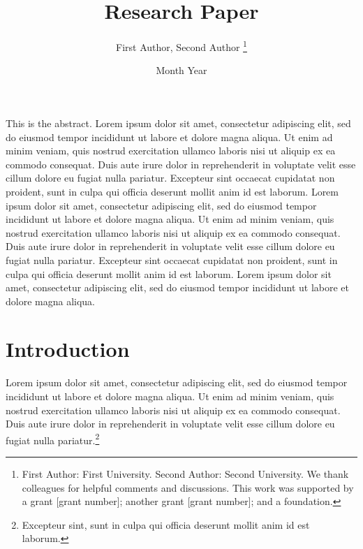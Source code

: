 \documentclass[letterpaper,11pt,leqno]{article}
\begin{document}
\title{Research Paper}

\author{First Author, Second Author
%
\thanks{First Author: First University. Second Author: Second University. We thank colleagues for helpful comments and discussions. This work was supported by a grant [grant number]; another grant [grant number]; and a foundation.}}

\date{Month Year}   


\begin{titlepage}
\maketitle

This is the abstract. Lorem ipsum dolor sit amet, consectetur adipiscing elit, sed do eiusmod tempor incididunt ut labore et dolore magna aliqua. Ut enim ad minim veniam, quis nostrud exercitation ullamco laboris nisi ut aliquip ex ea commodo consequat. Duis aute irure dolor in reprehenderit in voluptate velit esse cillum dolore eu fugiat nulla pariatur. Excepteur sint occaecat cupidatat non proident, sunt in culpa qui officia deserunt mollit anim id est laborum. Lorem ipsum dolor sit amet, consectetur adipiscing elit, sed do eiusmod tempor incididunt ut labore et dolore magna aliqua. Ut enim ad minim veniam, quis nostrud exercitation ullamco laboris nisi ut aliquip ex ea commodo consequat. Duis aute irure dolor in reprehenderit in voluptate velit esse cillum dolore eu fugiat nulla pariatur. Excepteur sint occaecat cupidatat non proident, sunt in culpa qui officia deserunt mollit anim id est laborum. Lorem ipsum dolor sit amet, consectetur adipiscing elit, sed do eiusmod tempor incididunt ut labore et dolore magna aliqua.

\end{titlepage}

\section{Introduction}\label{s:introduction}
 
Lorem ipsum dolor sit amet, consectetur adipiscing elit, sed do eiusmod tempor incididunt ut labore et dolore magna aliqua. Ut enim ad minim veniam, quis nostrud exercitation ullamco laboris nisi ut aliquip ex ea commodo consequat. Duis aute irure dolor in reprehenderit in voluptate velit esse cillum dolore eu fugiat nulla pariatur.\footnote{Excepteur sint, sunt in culpa qui officia deserunt mollit anim id est laborum.}
\end{document}
